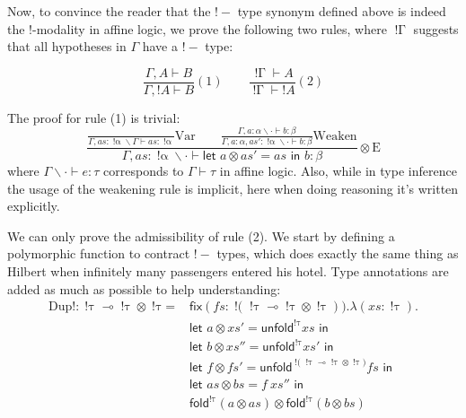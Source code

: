 \documentclass{article}
\newcommand{\bang}[1]{\operatorname{! #1}}
\newcommand{\letin}[2]{\textsf{let } #1 \textsf{ in } #2}
\newcommand{\fold}[2]{\textsf{fold}^{#1} #2}
\newcommand{\unfold}[2]{\textsf{unfold}^{#1} #2}
\begin{document}
Now, to convince the reader that the $!-$ type synonym defined above is indeed the !-modality in affine logic, we prove the following two rules, where $\bang \Gamma$ suggests that all hypotheses in $\Gamma$ have a $!-$ type:

\begin{displaymath}
  \frac
    {\Gamma, A \vdash B}
    {\Gamma, ! A \vdash B}
  (1)
  \qquad
  \frac
    {\bang \Gamma \vdash A}
    {\bang \Gamma \vdash ! A}
  (2)
\end{displaymath}

The proof for rule (1) is trivial:
\begin{displaymath}
  \displaystyle \frac
    { \displaystyle \frac 
        {}
        {\Gamma, as : \bang \alpha \backslash \Gamma \vdash as : \bang \alpha} 
      \mathrm{Var} \qquad
      \displaystyle \frac
        {\Gamma, a : \alpha \backslash \cdot \vdash b : \beta}
        {\Gamma, a : \alpha, as' : \bang \alpha \backslash \cdot \vdash b : \beta}
      \mathrm{Weaken}
    }
    {\Gamma, as : \bang \alpha \backslash \cdot \vdash \letin{a \otimes as' = as}{b} : \beta}
  \otimes \mathrm{E}
\end{displaymath}
where $\Gamma \backslash \cdot \vdash e : \tau$ corresponds to $\Gamma \vdash \tau$ in affine logic. Also, while in type inference the usage of the weakening rule is implicit, here when doing reasoning it's written explicitly.

We can only prove the admissibility of rule (2). We start by defining a polymorphic function to contract $!-$ types, which does exactly the same thing as Hilbert when infinitely many passengers entered his hotel. Type annotations are added as much as possible to help understanding:
\begin{align*}
\textrm{Dup!} : \bang \tau \multimap \bang \tau \otimes \bang \tau 
\text{= } & \textsf{fix}(fs : \bang (\bang \tau \multimap \bang \tau \otimes \bang \tau)). \lambda (xs : \bang \tau). \\
  & \letin{a \otimes xs' = \unfold{\bang \tau}{xs}}{} \\
  & \letin{b \otimes xs'' = \unfold{\bang \tau}{xs'}}{} \\
  & \letin{f \otimes fs' = \unfold{\bang (\bang \tau \multimap \bang \tau \otimes \bang \tau)}{fs}}{} \\
  & \letin{as \otimes bs = f ~ xs''}{} \\
  & \fold{\bang \tau}{(a \otimes as)} \otimes \fold{\bang \tau}{(b \otimes bs)}
\end{align*}
\end{document}
